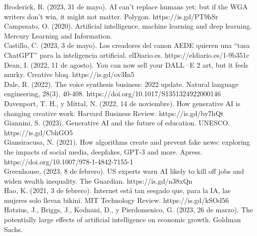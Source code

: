 \documentclass[12pt]{article}
\begin{document}
Broderick, R. (2023, 31 de mayo). AI can’t replace humans yet: but if the WGA writers don’t win, it might not
matter. Polygon. https://is.gd/PT9hSr\\
Campesato, O. (2020). Artificial intelligence, machine learning and deep learning. Mercury Learning and
Information.\\
Castillo, C. (2023, 3 de mayo). Los creadores del canon AEDE quieren una “tasa ChatGPT” para la inteligencia
artificial. elDiario.es. https://eldiario.es/1-9b351c\\
Dean, I. (2022, 11 de agosto). You can now sell your DALL·E 2 art, but it feels murky. Creative bloq. https://is.gd/ov3In5\\
Dale, R. (2022). The voice synthesis business: 2022 update. Natural language engineering, 28(3), 40-408.
https://doi.org/10.1017/S1351324922000146\\
Davenport, T. H., y Mittal, N. (2022, 14 de noviembre). How generative AI is changing creative work. Harvard
Business Review. https://is.gd/by7hQt\\
Giannini, S. (2023). Generative AI and the future of education. UNESCO. https://is.gd/CbhGO5\\
Giansiracusa, N. (2021). How algorithms create and prevent fake news: exploring the impacts of social media,
deepfakes, GPT-3 and more. Apress. https://doi.org/10.1007/978-1-4842-7155-1\\
Greenhouse, (2023, 8 de febrero). US experts warn AI likely to kill off jobs and widen wealth inequality. The
Guardian. https://is.gd/n38xQn\\
Hao, K. (2021, 3 de febrero). Internet está tan sesgado que, para la IA, las mujeres solo llevan bikini. MIT
Technology Review. https://is.gd/kSOd56\\
Hatzius, J., Briggs, J., Kodnani, D., y Pierdomenico, G. (2023, 26 de marzo). The potentially large effects of
artificial intelligence on economic growth. Goldman Sachs.
\end{document}
